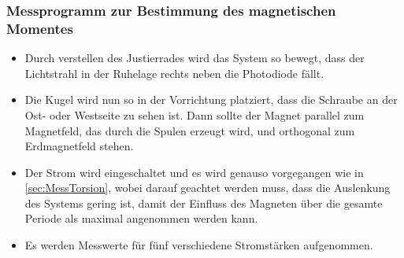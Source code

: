 \subsubsection{Messprogramm zur Bestimmung des magnetischen Momentes}

\begin{itemize}

  \item Durch verstellen des Justierrades wird das System so bewegt,
  dass der Lichtstrahl in der Ruhelage rechts neben die Photodiode fällt.

  \item Die Kugel wird nun so in der Vorrichtung platziert, dass die Schraube
  an der Ost- oder Westseite zu sehen ist. Dann sollte der Magnet parallel
  zum Magnetfeld, das durch die Spulen erzeugt wird, und orthogonal zum
  Erdmagnetfeld stehen.

  \item Der Strom wird eingeschaltet und es wird genauso vorgegangen wie in
  \ref{sec:MessTorsion}, wobei darauf geachtet werden muss, dass die Auslenkung
  des Systems gering ist, damit der Einfluss des Magneten über die gesamte
  Periode als maximal angenommen werden kann.

  \item Es werden Messwerte für fünf verschiedene Stromstärken aufgenommen.

\end{itemize}
